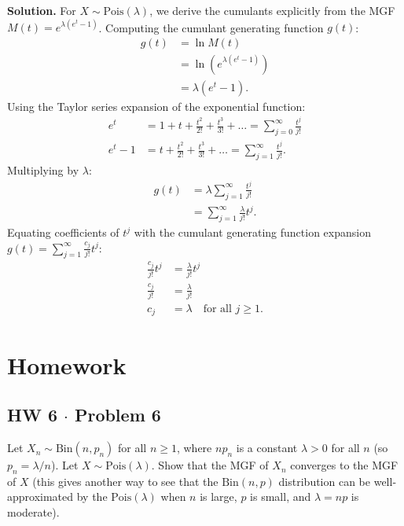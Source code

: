 \documentclass[11pt,a4paper]{article}
\begin{document}
\noindent \textbf{Solution.} For $X \sim \text{Pois}(\lambda)$, we derive the cumulants explicitly from the MGF $M(t) = e^{\lambda(e^t - 1)}$. Computing the cumulant generating function $g(t)$:
\begin{align*}
g(t) &= \ln M(t) \\
&= \ln\left( e^{\lambda(e^t - 1)} \right) \\
&= \lambda(e^t - 1).
\end{align*}
Using the Taylor series expansion of the exponential function:
\begin{align*}
e^t &= 1 + t + \frac{t^2}{2!} + \frac{t^3}{3!} + \dots = \sum_{j=0}^{\infty} \frac{t^j}{j!} \\
e^t - 1 &= t + \frac{t^2}{2!} + \frac{t^3}{3!} + \dots = \sum_{j=1}^{\infty} \frac{t^j}{j!}.
\end{align*}
Multiplying by $\lambda$:
\begin{align*}
g(t) &= \lambda \sum_{j=1}^{\infty} \frac{t^j}{j!} \\
&= \sum_{j=1}^{\infty} \frac{\lambda}{j!} t^j.
\end{align*}
Equating coefficients of $t^j$ with the cumulant generating function expansion $g(t) = \sum_{j=1}^{\infty} \frac{c_j}{j!} t^j$:
\begin{align*}
\frac{c_j}{j!} t^j &= \frac{\lambda}{j!} t^j \\
\frac{c_j}{j!} &= \frac{\lambda}{j!} \\
c_j &= \lambda \quad \text{for all } j \ge 1.
\end{align*}

\vspace{15pt}
\section{Homework}

\subsection{HW 6 $\cdot$ Problem 6}
\begin{tcolorbox}[title={HW 6 $\cdot$ Problem 6}]
Let $X_n \sim \text{Bin}(n, p_n)$ for all $n \ge 1$, where $np_n$ is a constant $\lambda > 0$ for all $n$ (so $p_n = \lambda / n$). Let $X \sim \text{Pois}(\lambda)$. Show that the MGF of $X_n$ converges to the MGF of $X$ (this gives another way to see that the $\text{Bin}(n, p)$ distribution can be well-approximated by the $\text{Pois}(\lambda)$ when $n$ is large, $p$ is small, and $\lambda = np$ is moderate).
\end{tcolorbox}
\end{document}
